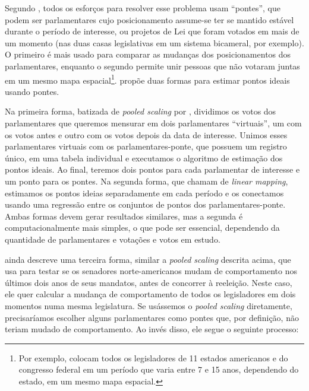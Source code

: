 \documentclass[a4paper,titlepage]{ppgi}\usepackage[]{graphicx}\usepackage[]{color}
\begin{document}
Segundo , todos os esforços para resolver esse problema
usam ``pontes'', que podem ser parlamentares cujo posicionamento assume-se ter
se mantido estável durante o período de interesse, ou projetos de Lei que
foram votados em mais de um momento (nas duas casas legislativas em um sistema
bicameral, por exemplo). O primeiro é mais usado para comparar as mudanças dos
posicionamentos dos parlamentares, enquanto o segundo permite unir pessoas que
não votaram juntas em um mesmo mapa espacial\footnote{Por exemplo,
 colocam todos os legisladores de 11 estados americanos e
do congresso federal em um período que varia entre 7 e 15 anos, dependendo do
estado, em um mesmo mapa espacial.}.  propõe duas formas
para estimar pontos ideais usando pontes.

Na primeira forma, batizada de \emph{pooled scaling} por ,
dividimos os votos dos parlamentares que queremos mensurar em dois
parlamentares ``virtuais'', um com os votos antes e outro com os votos depois
da data de interesse. Unimos esses parlamentares virtuais com os
parlamentares-ponte, que possuem um registro único, em uma tabela individual e
executamos o algoritmo de estimação dos pontos ideais. Ao final, teremos dois
pontos para cada parlamentar de interesse e um ponto para os pontes. Na
segunda forma, que  chamam de \emph{linear mapping},
estimamos os pontos ideias separadamente em cada período e os conectamos usando
uma regressão entre os conjuntos de pontos dos parlamentares-ponte. Ambas
formas devem gerar resultados similares, mas a segunda é computacionalmente
mais simples, o que pode ser essencial, dependendo da quantidade de
parlamentares e votações e votos em estudo.

 ainda descreve uma terceira forma, similar a
\emph{pooled scaling} descrita acima, que usa para testar se os senadores
norte-americanos mudam de comportamento nos últimos dois anos de seus mandatos,
antes de concorrer à reeleição. Neste caso, ele quer calcular a mudança de
comportamento de todos os legisladores em dois momentos numa mesma legislatura.
Se usássemos o \emph{pooled scaling} diretamente, precisaríamos escolher alguns
parlamentares como pontes que, por definição, não teriam mudado de
comportamento. Ao invés disso, ele segue o seguinte processo:
\end{document}
